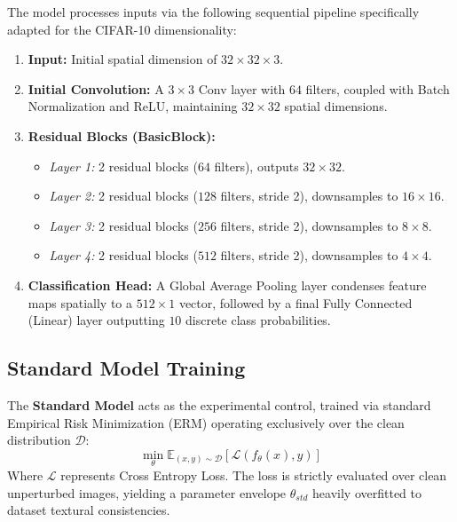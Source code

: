 \documentclass[12pt,a4paper]{article}
\begin{document}
The model processes inputs via the following sequential pipeline specifically adapted for the CIFAR-10 dimensionality:
\begin{enumerate}
    \item \textbf{Input:} Initial spatial dimension of $32 \times 32 \times 3$.
    \item \textbf{Initial Convolution:} A $3 \times 3$ Conv layer with $64$ filters, coupled with Batch Normalization and ReLU, maintaining $32 \times 32$ spatial dimensions.
    \item \textbf{Residual Blocks (BasicBlock):}
    \begin{itemize}
        \item \textit{Layer 1:} 2 residual blocks ($64$ filters), outputs $32 \times 32$.
        \item \textit{Layer 2:} 2 residual blocks ($128$ filters, stride 2), downsamples to $16 \times 16$.
        \item \textit{Layer 3:} 2 residual blocks ($256$ filters, stride 2), downsamples to $8 \times 8$.
        \item \textit{Layer 4:} 2 residual blocks ($512$ filters, stride 2), downsamples to $4 \times 4$.
    \end{itemize}
    \item \textbf{Classification Head:} A Global Average Pooling layer condenses feature maps spatially to a $512 \times 1$ vector, followed by a final Fully Connected (Linear) layer outputting $10$ discrete class probabilities.
\end{enumerate}

\subsection{Standard Model Training}
The \textbf{Standard Model} acts as the experimental control, trained via standard Empirical Risk Minimization (ERM) operating exclusively over the clean distribution $\mathcal{D}$:
\begin{equation}
    \min_{\theta} \mathbb{E}_{(x,y) \sim \mathcal{D}} [ \mathcal{L}(f_\theta(x), y) ]
\end{equation}
Where $\mathcal{L}$ represents Cross Entropy Loss. The loss is strictly evaluated over clean unperturbed images, yielding a parameter envelope $\theta_{std}$ heavily overfitted to dataset textural consistencies.
\end{document}
